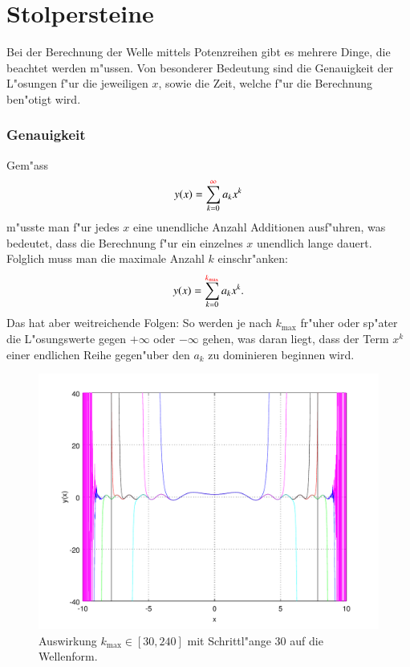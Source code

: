 \section{Stolpersteine}
Bei der Berechnung der Welle mittels Potenzreihen gibt es mehrere Dinge, die 
beachtet werden m"ussen. Von besonderer Bedeutung sind die Genauigkeit der 
L"osungen f"ur die jeweiligen $x$, sowie die Zeit, welche f"ur die 
Berechnung ben"otigt wird.

\subsubsection{Genauigkeit}
Gem"ass
\begin{equation*}
	y(x) = \sum_{k=0}^{\textcolor{red}{\infty}}a_kx^k
\end{equation*}
m"usste man f"ur jedes $x$ eine unendliche Anzahl Additionen ausf"uhren, was 
bedeutet, dass die Berechnung f"ur ein einzelnes $x$ unendlich lange 
dauert. Folglich muss man die maximale Anzahl $k$ einschr"anken:
\begin{equation*}
	y(x) = \sum_{k=0}^{\textcolor{red}{k_{\text{max}}}}a_kx^k.
\end{equation*}
Das hat aber weitreichende Folgen: So werden je nach $k_{\text{max}}$ fr"uher 
oder sp"ater die L"osungswerte gegen $+\infty$ oder $-\infty$ gehen, was daran 
liegt, dass der Term $x^k$ einer endlichen Reihe gegen"uber den $a_k$ zu 
dominieren beginnen wird.

\begin{figure}
	\includegraphics[width=1\hsize]{./wellen/images/kmax/kmax.pdf}
	\caption{Auswirkung $k_{\text{max}} \in [30,240]$ mit Schrittl"ange 30 auf 
	die Wellenform.}
	\label{fig:wellen:variablekmax}
\end{figure}

